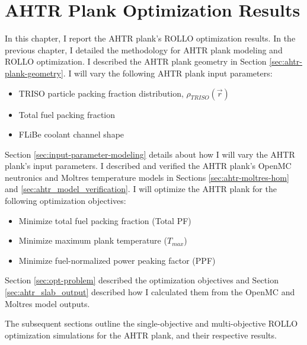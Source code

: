 \chapter{AHTR Plank Optimization Results}
\glsresetall
\label{chap:ahtr-plank-opt-results}
In this chapter, I report the \gls{AHTR} plank's \gls{ROLLO} optimization results. 
In the previous chapter, I detailed the methodology for \gls{AHTR} plank modeling and 
\gls{ROLLO} optimization. 
I described the \gls{AHTR} plank geometry in Section \ref{sec:ahtr-plank-geometry}.
I will vary the following \gls{AHTR} plank input parameters:
\begin{itemize}
    \item \gls{TRISO} particle packing fraction distribution, 
    $\rho_{TRISO}(\vec{r})$
    \item Total fuel packing fraction
    \item \gls{FLiBe} coolant channel shape 
\end{itemize} 
Section \ref{sec:input-parameter-modeling} details about how I will vary the 
\gls{AHTR} plank's input parameters. 
I described and verified the \gls{AHTR} plank's OpenMC neutronics and Moltres 
temperature models in Sections \ref{sec:ahtr-moltres-hom} and 
\ref{sec:ahtr_model_verification}. 
I will optimize the \gls{AHTR} plank for the following optimization objectives:
\begin{itemize}
    \item Minimize total fuel packing fraction (Total PF)
    \item Minimize maximum plank temperature ($T_{max}$)
    \item Minimize fuel-normalized power peaking factor (PPF)
\end{itemize} 
Section \ref{sec:opt-problem} described the optimization objectives and Section 
\ref{sec:ahtr_slab_output} described how I calculated them from the OpenMC and Moltres 
model outputs. 

The subsequent sections outline the single-objective and multi-objective 
ROLLO optimization simulations for the \gls{AHTR} plank, and their respective results. 

